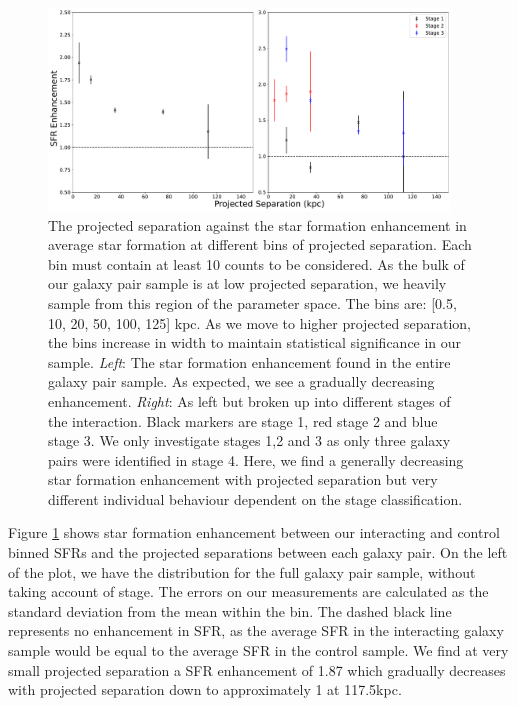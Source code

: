 \begin{figure}
    \centering
    \includegraphics[width=0.95\textwidth]{Chapter3/figures/sfr-enhancement-projected-sep.pdf}
    \caption{The projected separation against the star formation enhancement in average star formation at different bins of projected separation. Each bin must contain at least 10 counts to be considered. As the bulk of our galaxy pair sample is at low projected separation, we heavily sample from this region of the parameter space. The bins are: [0.5, 10, 20, 50, 100, 125] kpc. As we move to higher projected separation, the bins increase in width to maintain statistical significance in our sample. \textit{Left}: The star formation enhancement found in the entire galaxy pair sample. As expected, we see a gradually decreasing enhancement. \textit{Right}: As left but broken up into different stages of the interaction. Black markers are stage 1, red stage 2 and blue stage 3. We only investigate stages 1,2 and 3 as only three galaxy pairs were identified in stage 4. Here, we find a generally decreasing star formation enhancement with projected separation but very different individual behaviour dependent on the stage classification.}
    \label{fig:sfr-enhancement-sep}
\end{figure}

Figure \ref{fig:sfr-enhancement-sep} shows star formation enhancement between our interacting and control binned SFRs and the projected separations between each galaxy pair. On the left of the plot, we have the distribution for the full galaxy pair sample, without taking account of stage. The errors on our measurements are calculated as the standard deviation from the mean within the bin. The dashed black line represents no enhancement in SFR, as the average SFR in the interacting galaxy sample would be equal to the average SFR in the control sample. We find at very small projected separation a SFR enhancement of 1.87 which gradually decreases with projected separation down to approximately 1 at 117.5kpc. 

